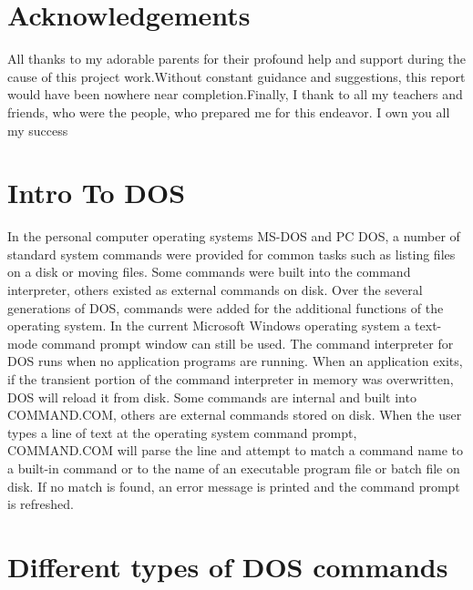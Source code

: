 \documentclass[17pt,a4paper,oneside,margin=1in]{article}
\begin{document}

\tableofcontents
\pagestyle{plain}

\pagebreak

\section*{Acknowledgements}

All thanks to my adorable parents for their profound help and support during the cause of this project work.Without constant guidance and suggestions, this report would have been nowhere near completion.Finally, I thank to all my teachers and friends, who were the people, who prepared me for this endeavor. I own you all my success

\clearpage
\section{Intro To DOS} 
In the personal computer operating systems MS-DOS and PC DOS, a number of standard system commands were provided for common tasks such as listing files on a disk or moving files. Some commands were built into the command interpreter, others existed as external commands on disk. Over the several generations of DOS, commands were added for the additional functions of the operating system. In the current Microsoft Windows operating system a text-mode command prompt window can still be used. 
The command interpreter for DOS runs when no application programs are running. When an application exits, if the transient portion of the command interpreter in memory was overwritten, DOS will reload it from disk. Some commands are internal and built into COMMAND.COM, others are external commands stored on disk. When the user types a line of text at the operating system command prompt, COMMAND.COM will parse the line and attempt to match a command name to a built-in command or to the name of an executable program file or batch file on disk. If no match is found, an error message is printed and the command prompt is refreshed.
\section{Different types of DOS commands}
\end{document}
